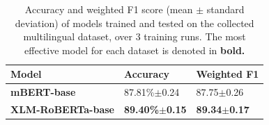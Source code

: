 \documentclass{l4proj}
\begin{document}
\begin{table}[h]
\begin{tabular}{lll}
\hline
\textbf{Model}   & \textbf{Accuracy} & \textbf{Weighted F1} \\ \hline
\textbf{mBERT-base}       & 87.81\%$\pm$0.24     & 87.75$\pm$0.26        \\
\textbf{XLM-RoBERTa-base} & \textbf{89.40\%$\pm$0.15}     & \textbf{89.34$\pm$0.17}                 \\ \hline
\end{tabular}
\caption{Accuracy and weighted F1 score (mean $\pm$ standard deviation) of models trained and tested on the collected multilingual dataset, over 3 training runs. The most effective model for each dataset is denoted in \textbf{bold.}}
\label{table:realworld-effectiveness}
\end{table}
\end{document}
